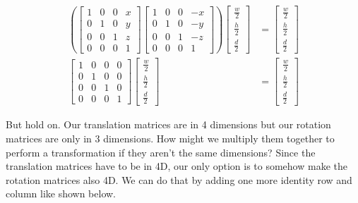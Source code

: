\documentclass[14pt]{article}
\begin{document}
\begin{equation}
\begin{aligned}
	\left( \begin{bmatrix}
			1 & 0 & 0 & x \\
			0 & 1 & 0 & y \\ 
			0 & 0 & 1 & z \\
			0 & 0 & 0 & 1
	\end{bmatrix}
	\begin{bmatrix}
			1 & 0 & 0 & -x \\
			0 & 1 & 0 & -y \\ 
			0 & 0 & 1 & -z \\
			0 & 0 & 0 & 1
	\end{bmatrix} \right)
	\begin{bmatrix}
			\frac{w}{2} \\[6pt]
			\frac{h}{2} \\[6pt] 
			\frac{d}{2}
	\end{bmatrix}
	&=
	\begin{bmatrix}
			\frac{w}{2} \\[6pt]
			\frac{h}{2} \\[6pt]
			\frac{d}{2}
	\end{bmatrix} \\[6pt]
	\begin{bmatrix}
			1 & 0 & 0 & 0 \\
			0 & 1 & 0 & 0 \\ 
			0 & 0 & 1 & 0 \\
			0 & 0 & 0 & 1
	\end{bmatrix}
	\begin{bmatrix}
			\frac{w}{2} \\[6pt]
			\frac{h}{2} \\[6pt] 
			\frac{d}{2}
	\end{bmatrix}
	&=
	\begin{bmatrix}
			\frac{w}{2} \\[6pt]
			\frac{h}{2} \\[6pt]
			\frac{d}{2}
	\end{bmatrix}
\end{aligned}
\end{equation}

\vspace*{1em}

But hold on. Our translation matrices are in 4 dimensions but our rotation matrices are only in 3 dimensions. How might we multiply them together to perform a transformation if they aren't the same dimensions? Since the translation matrices have to be in 4D, our only option is to somehow make the rotation matrices also 4D. We can do that by adding one more identity row and column like shown below.
\end{document}
